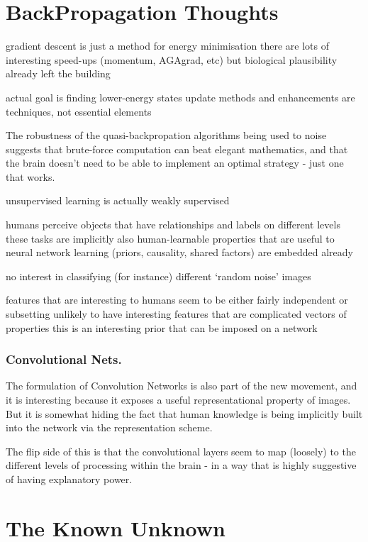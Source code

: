 \documentclass[citeauthoryear]{llncs}
\begin{document}
\section{BackPropagation Thoughts}
  gradient descent is just a method for energy minimisation
    there are lots of interesting speed-ups (momentum, AGAgrad, etc)
      but biological plausibility already left the building
      
    actual goal is finding lower-energy states
      update methods and enhancements are techniques, not essential elements




The robustness of the quasi-backpropation algorithms being used to noise
suggests that brute-force computation can beat elegant mathematics, and that 
the brain doesn't need to be able to implement an optimal strategy - just one that works.


unsupervised learning is actually weakly supervised 

  humans perceive objects that have relationships and labels on different levels
    these tasks are implicitly also human-learnable
    properties that are useful to neural network learning (priors, causality, shared factors) are embedded already
    
  no interest in classifying (for instance) different `random noise' images
  
  features that are interesting to humans seem to be either fairly independent or subsetting
    unlikely to have interesting features that are complicated vectors of properties
    this is an interesting prior that can be imposed on a network

\subsubsection*{Convolutional Nets.}
The formulation of Convolution Networks is also part of the new movement, 
and it is interesting because it exposes a useful representational property of images.  
But it is somewhat hiding the fact that human knowledge is being implicitly 
built into the network via the representation scheme.

The flip side of this is that the convolutional layers seem to 
map (loosely) to the different levels of processing within the brain - 
in a way that is highly suggestive of having explanatory power.


\section{The Known Unknown}
\end{document}
